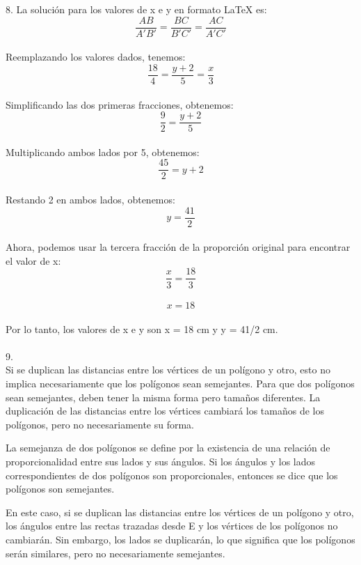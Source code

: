 \documentclass{article}
\begin{document}
\begin{center}
\end{center}
{\Large 8.}
La solución para los valores de x e y en formato LaTeX es:\\
$$\frac{AB}{A'B'} = \frac{BC}{B'C'} = \frac{AC}{A'C'}$$\\
Reemplazando los valores dados, tenemos:\\
$$\frac{18}{4} = \frac{y+2}{5} = \frac{x}{3}$$\\
Simplificando las dos primeras fracciones, obtenemos:\\
$$\frac{9}{2} = \frac{y+2}{5}$$\\
Multiplicando ambos lados por 5, obtenemos:\\
$$\frac{45}{2} = y+2$$\\
Restando 2 en ambos lados, obtenemos:\\
$$y = \frac{41}{2}$$\\
Ahora, podemos usar la tercera fracción de la proporción original para encontrar el valor de x:\\
$$\frac{x}{3} = \frac{18}{3}$$\\
$$x = 18$$\\
Por lo tanto, los valores de x e y son x = 18 cm y y = 41/2 cm.\\
\\
{\Large 9.}
\\
Si se duplican las distancias entre los vértices de un polígono y otro, esto no implica necesariamente que los polígonos sean semejantes. Para que dos polígonos sean semejantes, deben tener la misma forma pero tamaños diferentes. La duplicación de las distancias entre los vértices cambiará los tamaños de los polígonos, pero no necesariamente su forma.

La semejanza de dos polígonos se define por la existencia de una relación de proporcionalidad entre sus lados y sus ángulos. Si los ángulos y los lados correspondientes de dos polígonos son proporcionales, entonces se dice que los polígonos son semejantes.

En este caso, si se duplican las distancias entre los vértices de un polígono y otro, los ángulos entre las rectas trazadas desde E y los vértices de los polígonos no cambiarán. Sin embargo, los lados se duplicarán, lo que significa que los polígonos serán similares, pero no necesariamente semejantes.
\end{document}
